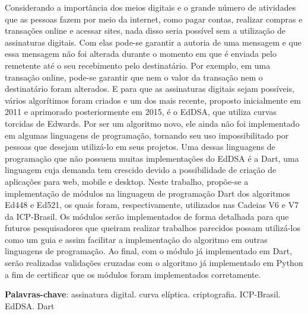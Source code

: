\begin{resumo}

Considerando a importância dos meios digitais e o grande número de atividades que as pessoas fazem por meio da internet, como pagar contas, realizar compras e transações online e acessar sites, nada disso seria possível sem a utilização de assinaturas digitais. Com elas pode-se garantir a autoria de uma mensagem e que essa mensagem não foi alterada durante o momento em que é enviada pelo remetente até o seu recebimento pelo destinatário. Por exemplo, em uma transação online, pode-se garantir que nem o valor da transação nem o destinatário foram alterados. E para que as assinaturas digitais sejam possíveis, vários algorítimos foram criados e um dos mais recente, proposto inicialmente em 2011 e aprimorado posteriormente em 2015, é o EdDSA, que utiliza curvas torcidas de Edwards. Por ser um algoritmo novo, ele ainda não foi implementado em algumas linguagens de programação, tornando seu uso impossibilitado por pessoas que desejam utilizá-lo em seus projetos. Uma dessas linguagens de programação que não possuem muitas implementações do EdDSA é a Dart, uma linguagem cuja demanda tem crescido devido a possibilidade de criação de aplicações para web, mobile e desktop. Neste trabalho, propõe-se a implementação de módulos na linguagem de programação Dart dos algoritmos Ed448 e Ed521, os quais foram, respectivamente, utilizados nas Cadeias V6 e V7 da ICP-Brasil. Os módulos serão implementados de forma detalhada para que futuros pesquisadores que queiram realizar trabalhos parecidos possam utilizá-los como um guia e assim facilitar a implementação do algoritmo em outras linguagens de programação. Ao final, com o módulo já implementado em Dart, serão realizadas validações cruzadas com o algoritmo já implementado em Python a fim de certificar que os módulos foram implementados corretamente.

 \vspace{\onelineskip}
    
 \noindent
 \textbf{Palavras-chave}: assinatura digital. curva elíptica. criptografia. ICP-Brasil. EdDSA. Dart
\end{resumo}
